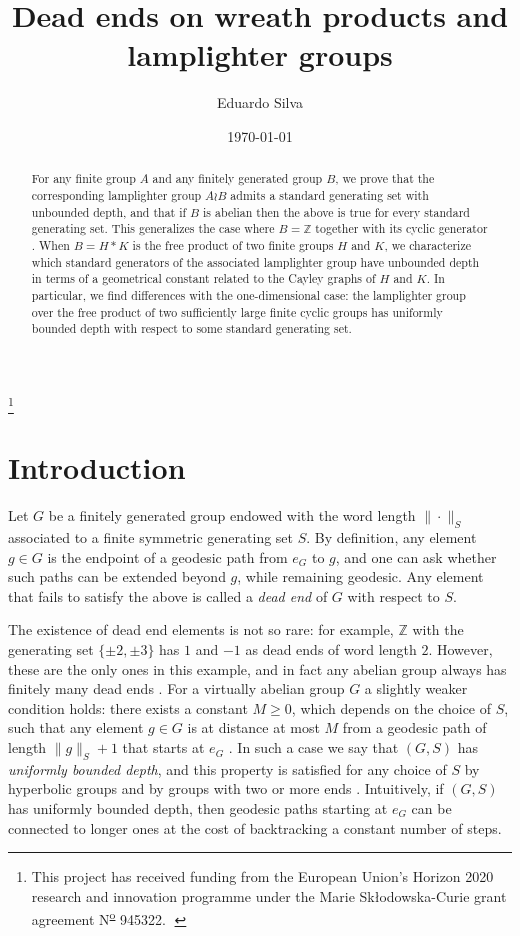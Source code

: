 \documentclass[reqno,oneside]{amsart}
\title{Dead ends on wreath products and lamplighter groups}
\date{\today}
\newcommand*{\img}[1]{%
	\raisebox{-.0\baselineskip}{%
		\texttt{[image: \#1]}%
	}%
}
\newcommand\blfootnote[1]{%
	\begingroup
	\renewcommand\thefootnote{}\footnote{#1}%
	\addtocounter{footnote}{-1}%
	\endgroup
}
\newcommand{\Z}{\mathbb{Z}}
\theoremstyle{plain}
\theoremstyle{definition}
\begin{document}
\author{Eduardo Silva} 
\maketitle
    \blfootnote{This project has received funding
    	from the European Union’s Horizon 2020 research and innovation
    	programme under the Marie Sk\l{}odowska-Curie grant agreement N\textsuperscript{\underline{o}} 945322. $\;$\img{EU}}
\begin{abstract} 
	For any finite group $A$ and any finitely generated group $B$, we prove that the corresponding lamplighter group $A\wr B$ admits a standard generating set with unbounded depth, and that if $B$ is abelian then the above is true for every standard generating set. This generalizes the case where $B=\Z$ together with its cyclic generator \cite{ClearyTaback05}. When $B=H*K$ is the free product of two finite groups $H$ and $K$, we characterize which standard generators of the associated lamplighter group have unbounded depth in terms of a geometrical constant related to the Cayley graphs of $H$ and $K$. In particular, we find differences with the one-dimensional case: the lamplighter group over the free product of two sufficiently large finite cyclic groups has uniformly bounded depth with respect to some standard generating set.

\end{abstract}


\section{Introduction} \label{Introduction}

Let $G$ be a finitely generated group endowed with the word length $\|\cdot\|_S$ associated to a finite symmetric generating set $S$. By definition, any element $g\in G$ is the endpoint of a geodesic path from $e_G$ to $g$, and one can ask whether such paths can be extended beyond $g$, while remaining geodesic. Any element that fails to satisfy the above is called a \textit{dead end} of $G$ with respect to $S$.

The existence of dead end elements is not so rare: for example, $\mathbb{Z}$ with the generating set $\{\pm 2, \pm 3\}$ has $1$ and $-1$ as dead ends of word length $2$. However, these are the only ones in this example, and in fact any abelian group always has finitely many dead ends \cite{lehnert2009some,vsunic2008frobenius}. For a virtually abelian group $G$ a slightly weaker condition holds: there exists a constant $M\ge 0$, which depends on the choice of $S$, such that any element $g\in G$ is at distance at most $M$ from a geodesic path of length $\|g\|_{S}+1$ that starts at $e_G$ \cite{warshall2010deep}. In such a case we say that $(G,S)$ has \textit{uniformly bounded depth}, and this property is satisfied for any choice of $S$ by hyperbolic groups \cite{Bogopolski97,warshall2010deep} and by groups with two or more ends \cite{lehnert2009some}. Intuitively, if $(G,S)$ has uniformly bounded depth, then geodesic paths starting at $e_G$ can be connected to longer ones at the cost of backtracking a constant number of steps.
\end{document}
